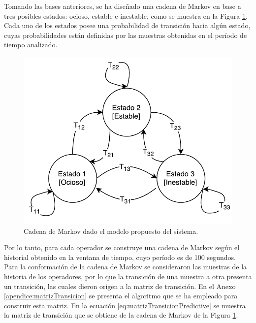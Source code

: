 Tomando las bases anteriores, se ha diseñado una cadena de Markov en base a tres posibles estados: ocioso, estable e inestable, como se muestra en la Figura \ref{fig:cadenaMarkovPredictiva}. Cada uno de los estados posee una probabilidad de transición hacia algún estado, cuyas probabilidades están definidas por las muestras obtenidas en el período de tiempo analizado.

\begin{figure}[ht!]
  \centering
    \includegraphics[scale=0.75]{images/CadenaMarkovPredictiva.pdf}
  \caption{Cadena de Markov dado el modelo propuesto del sistema.}
  \label{fig:cadenaMarkovPredictiva}
\end{figure}


Por lo tanto, para cada operador se construye una cadena de Markov según el historial obtenido en la ventana de tiempo, cuyo período es de 100 segundos. Para la conformación de la cadena de Markov se consideraron las muestras de la historia de los operadores, por lo que la transición de una muestra a otra presenta un transición, las cuales dieron origen a la matriz de transición. En el Anexo \ref{apendice:matrizTransicion} se presenta el algoritmo que se ha empleado para construir esta matriz. En la ecuación \ref{eq:matrizTransicionPredictive} se muestra la matriz de transición que se obtiene de la cadena de Markov de la Figura \ref{fig:cadenaMarkovPredictiva}.

